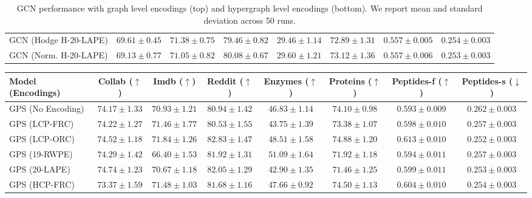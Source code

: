 \begin{table*}[t!]
\begin{tabular}{|l|c|c|c|c|c|c|c|}
GCN (Hodge H-20-LAPE) & $69.61 \pm 0.45$ & $71.38 \pm 0.75$ & $79.46 \pm 0.82$ & $29.46 \pm 1.14$ & $72.89 \pm 1.31$ & $0.557 \pm 0.005$ & $0.254 \pm 0.003$ \\ 
GCN (Norm. H-20-LAPE) & $69.13 \pm 0.77$ & $71.05 \pm 0.82$ & $80.08 \pm 0.67$ & $29.60 \pm 1.21$ & $73.12 \pm 1.36$ & $0.557 \pm 0.006$ & $0.253 \pm 0.003$ \\ \hline
\end{tabular}
\caption{GCN performance with graph level encodings (top) and hypergraph level encodings (bottom). We report mean and standard deviation across 50 runs.}
\label{tab:gcn}
\end{table*}


\begin{table*}[ht!]
\centering
\tiny
\begin{tabular}{|l|c|c|c|c|c|c|c|}
\hline
\textbf{Model (Encodings)} & \textbf{Collab} ($\uparrow$) & \textbf{Imdb} ($\uparrow$) & \textbf{Reddit} ($\uparrow$) & \textbf{Enzymes} ($\uparrow$) & \textbf{Proteins} ($\uparrow$) & \textbf{Peptides-f} ($\uparrow$) & \textbf{Peptides-s} ($\downarrow$) \\
\hline
GPS (No Encoding) & $74.17 \pm 1.33$ & $70.93 \pm 1.21$ & $80.94 \pm 1.42$ & $46.83 \pm 1.14$ & $74.10 \pm 0.98$ & $0.593 \pm 0.009$ & $0.262 \pm 0.003$ \\ \hline
GPS (LCP-FRC) & $74.22 \pm 1.27$ & $71.46 \pm 1.77$ & $80.53 \pm 1.55$ & $43.75 \pm 1.39$ & $73.38 \pm 1.07$ & $0.598 \pm 0.010$ & $0.257 \pm 0.003$ \\
GPS (LCP-ORC) & $74.52 \pm 1.18$ & $71.84 \pm 1.26$ & $82.83 \pm 1.47$ & $48.51 \pm 1.58$ & $74.88 \pm 1.20$ & $0.613 \pm 0.010$ & $0.252 \pm 0.003$ \\
GPS (19-RWPE) & $74.29 \pm 1.42$ & $66.40 \pm 1.53$ & $81.92 \pm 1.31$ & $51.09 \pm 1.64$ & $71.92 \pm 1.18$ & $0.594 \pm 0.011$ & $0.257 \pm 0.003$ \\
GPS (20-LAPE) & $74.74 \pm 1.23$ & $70.67 \pm 1.18$ & $82.05 \pm 1.29$ & $42.90 \pm 1.35$ & $71.46 \pm 1.25$ & $0.599 \pm 0.011$ & $0.253 \pm 0.003$ \\
\hline
GPS (HCP-FRC) & $73.37 \pm 1.59$ & $71.48 \pm 1.03$ & $81.68 \pm 1.16$ & $47.66 \pm 0.92$ & $74.50 \pm 1.13$ & $0.604 \pm 0.010$ & $0.254 \pm 0.003$ \\

\end{tabular}
\end{table*}
